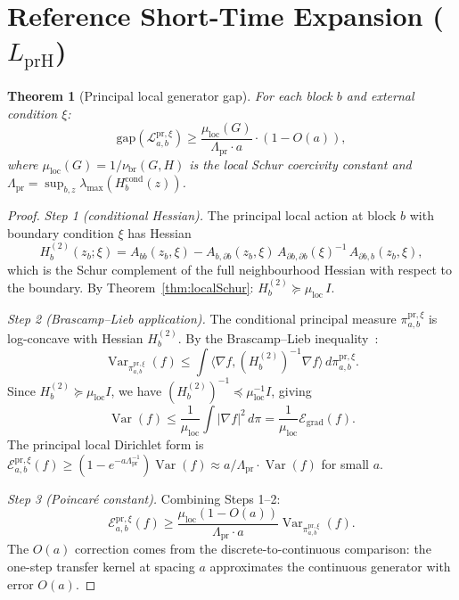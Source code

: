 \documentclass[12pt]{article}
\theoremstyle{plain}
\newtheorem{theorem}{Theorem}[section]
\theoremstyle{definition}
\numberwithin{equation}{section}
\newcommand{\Var}{\operatorname{Var}}
\newcommand{\pr}{\mathrm{pr}}
\newcommand{\loc}{\mathrm{loc}}
\newcommand{\br}{\mathrm{br}}
\begin{document}
\section{Reference Short-Time Expansion ($L_{\mathrm{prH}}$)}\label{sec:LprH}

\begin{theorem}[Principal local generator gap]\label{thm:LprH}
For each block $b$ and external condition $\xi$:
\begin{equation}
\mathrm{gap}(\mathcal{L}_{a,b}^{\pr,\xi}) \geq \frac{\mu_{\loc}(G)}{\Lambda_{\pr}\cdot a}\cdot(1-O(a)),
\end{equation}
where $\mu_{\loc}(G)=1/\nu_{\br}(G,H)$ is the local Schur coercivity constant and $\Lambda_{\pr}=\sup_{b,z}\lambda_{\max}(H_b^{\mathrm{cond}}(z))$.
\end{theorem}

\begin{proof}
\emph{Step 1 (conditional Hessian).}  The principal local action at block $b$ with boundary condition $\xi$ has Hessian
\begin{equation}
H_b^{(2)}(z_b;\xi) = A_{bb}(z_b,\xi) - A_{b,\partial b}(z_b,\xi)\,A_{\partial b,\partial b}(\xi)^{-1}\,A_{\partial b,b}(z_b,\xi),
\end{equation}
which is the Schur complement of the full neighbourhood Hessian with respect to the boundary.  By Theorem~\ref{thm:localSchur}: $H_b^{(2)}\succeq\mu_{\loc}\,I$.

\emph{Step 2 (Brascamp--Lieb application).}  The conditional principal measure $\pi_{a,b}^{\pr,\xi}$ is log-concave with Hessian $H_b^{(2)}$.  By the Brascamp--Lieb inequality~\cite{BrascampLieb}:
\begin{equation}
\Var_{\pi_{a,b}^{\pr,\xi}}(f) \leq \int\langle\nabla f,(H_b^{(2)})^{-1}\nabla f\rangle\,d\pi_{a,b}^{\pr,\xi}.
\end{equation}
Since $H_b^{(2)}\succeq\mu_{\loc} I$, we have $(H_b^{(2)})^{-1}\preceq\mu_{\loc}^{-1}I$, giving
\begin{equation}
\Var(f) \leq \frac{1}{\mu_{\loc}}\int|\nabla f|^2\,d\pi = \frac{1}{\mu_{\loc}}\mathcal{E}_{\mathrm{grad}}(f).
\end{equation}
The principal local Dirichlet form is $\mathcal{E}_{a,b}^{\pr,\xi}(f)\geq(1-e^{-a\Lambda_{\pr}^{-1}})\Var(f)\approx a/\Lambda_{\pr}\cdot\Var(f)$ for small $a$.

\emph{Step 3 (Poincar\'e constant).}  Combining Steps 1--2:
\begin{equation}
\mathcal{E}_{a,b}^{\pr,\xi}(f) \geq \frac{\mu_{\loc}(1-O(a))}{\Lambda_{\pr}\cdot a}\Var_{\pi_{a,b}^{\pr,\xi}}(f).
\end{equation}
The $O(a)$ correction comes from the discrete-to-continuous comparison: the one-step transfer kernel at spacing $a$ approximates the continuous generator with error $O(a)$.
\end{proof}
\end{document}
